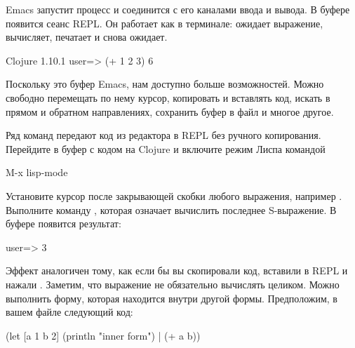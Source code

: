 Emacs запустит процесс и соединится с его каналами ввода и вывода. В буфере  появится сеанс REPL. Он работает как в терминале: ожидает выражение, вычисляет, печатает и снова ожидает.

\begin{english}
  \begin{clojure}
Clojure 1.10.1
user=> (+ 1 2 3)
6
  \end{clojure}
\end{english}


Поскольку это буфер Emacs, нам доступно больше возможностей. Можно свободно перемещать по нему курсор, копировать и вставлять код, искать в прямом и обратном направлениях, сохранить буфер в файл и многое другое.

Ряд команд передают код из редактора в REPL без ручного копирования. Перейдите в буфер с кодом на Clojure и включите режим Лиспа командой

\begin{english}
  \begin{text}
M-x lisp-mode
  \end{text}
\end{english}


Установите курсор после закрывающей скобки любого выражения, например . Выполните команду , которая означает вычислить последнее S-выражение. В буфере  появится результат:

\begin{english}
  \begin{text}
user=> 3
  \end{text}
\end{english}

Эффект аналогичен тому, как если бы вы скопировали код, вставили в REPL и нажали \enter. Заметим, что выражение не обязательно вычислять целиком. Можно выполнить форму, которая находится внутри другой формы. Предположим, в вашем файле следующий код:

\begin{english}
  \begin{clojure/lines}
(let [a 1 b 2]
  (println "inner form") |
  (+ a b))
  \end{clojure/lines}
\end{english}


